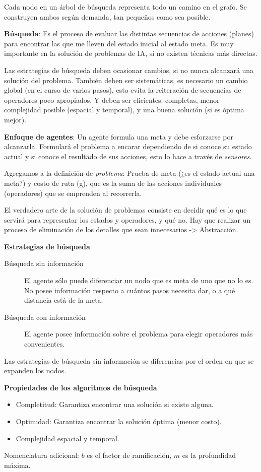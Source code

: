 Cada nodo en un árbol de búsqueda representa todo un camino en el grafo. Se
construyen ambos según demanda, tan pequeños como sea posible.

\textbf{Búsqueda}: Es el proceso de evaluar las distintas secuencias de acciones
(planes) para encontrar las que me lleven del estado inicial al estado meta. Es
muy importante en la solución de problemas de IA, si no existen técnicas más
directas.

Las estrategias de búsqueda deben ocasionar cambios, si no nunca alcanzará una
solución del problema. También deben ser sistemáticas, es necesario un cambio
global (en el curso de varios pasos), esto evita la reiteración de secuencias de
operadores poco apropiados. Y deben ser eficientes: completas, menor complejidad
posible (espacial y temporal), y una buena solución (si es óptima mejor).

\textbf{Enfoque de agentes}: Un agente formula una meta y debe esforzarse por
alcanzarla. Formulará el problema a encarar dependiendo de si conoce su estado
actual y si conoce el resultado de sus acciones, esto lo hace a través de
\textit{sensores}.

Agregamos a la definición de \textit{problema}: Prueba de meta (¿es el estado
actual una meta?) y costo de ruta (g), que es la suma de las acciones
individuales (operadores) que se emprenden al recorrerla.

El verdadero arte de la solución de problemas consiste en decidir qué es lo que
servirá para representar los estados y operadores, y qué no. Hay que realizar un
proceso de eliminación de los detalles que sean innecesarios -> Abstracción.

\textbf{Estrategias de búsqueda}
\begin{description}
    \item[Búsqueda sin información] El agente sólo puede diferenciar un nodo que
        es meta de uno que no lo es. No posee información respecto a cuántos pasos
        necesita dar, o a qué distancia está de la meta.
    \item[Búsqueda con información] El agente posee información sobre el problema
        para elegir operadores más convenientes.
\end{description}
Las estrategias de búsqueda sin información se diferencias por el orden en que se
expanden los nodos.

\textbf{Propiedades de los algoritmos de búsqueda}
\begin{itemize}
    \item Completitud: Garantiza encontrar una solución si existe alguna.
    \item Optimidad: Garantiza encontrar la solución óptima (menor costo).
    \item Complejidad espacial y temporal.
\end{itemize}
Nomenclatura adicional: $b$ es el factor de ramificación, $m$ es la profundidad
máxima.

